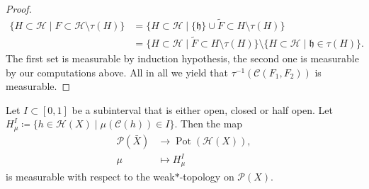\begin{proof}
  \begin{align*}
    \{H \subset \mathcal{H} \mid F \subset \mathcal{H} \setminus \tau(H)\}
    & = \{H \subset \mathcal{H} \mid \{\mathfrak{h}\} \cup \tilde F \subset H \setminus \tau(H)\}\\
    & = \{H \subset \mathcal{H} \mid \tilde{F} \subset H \setminus \tau(H)\} \setminus \{H \subset \mathcal{H} \mid \mathfrak{h} \in \tau(H)\}.
  \end{align*}
  The first set is measurable by induction hypothesis, the second one is measurable by our computations above. All in all we yield that \(\tau^{-1}(\mathcal{C}(F_1, F_2))\) is measurable.
\end{proof}


\begin{lemma}[{\cites[Lemma~ A.1]{MR3509968}}]
  \label{lem:measurable-mu}
  Let \(I \subset [0,1]\) be a subinterval that is either open, closed or half open. Let \(H^I_\mu \coloneqq \{h \in \mathcal{H}(X) \mid \mu(\mathcal{C}(h)) \in I\}\). Then the map
  \begin{align*}
    \mathcal{P}(\bar X) &\to \operatorname{Pot}(\mathcal{H}(X)),\\
    \mu &\mapsto H^I_\mu
  \end{align*}
  is measurable with respect to the weak\(\ast\)-topology on \(\mathcal{P}(X)\).
\end{lemma}

